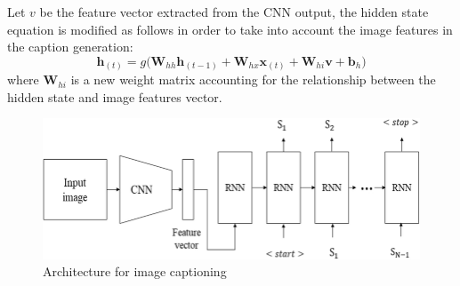 Let $v$ be the feature vector extracted from the CNN output, the hidden state equation is modified as follows in order to take into account the image features in the caption generation: 
\begin{equation*}
    \mathbf{h}_{(t)}=g\big(
        \mathbf{W}_{hh} \mathbf{h}_{(t-1)}+
        \mathbf{W}_{hx} \mathbf{x}_{(t)}+
        \mathbf{W}_{hi} \mathbf{v}+
        \mathbf{b}_h
    \big)
\end{equation*}
where $\mathbf{W}_{hi}$ is a new weight matrix accounting for the relationship between the hidden state and image features vector.

\begin{figure}[h]
    \centering
    \includegraphics[scale=1.4]{img/img_caption_2.jpg}
    \caption{Architecture for image captioning}
\end{figure}

